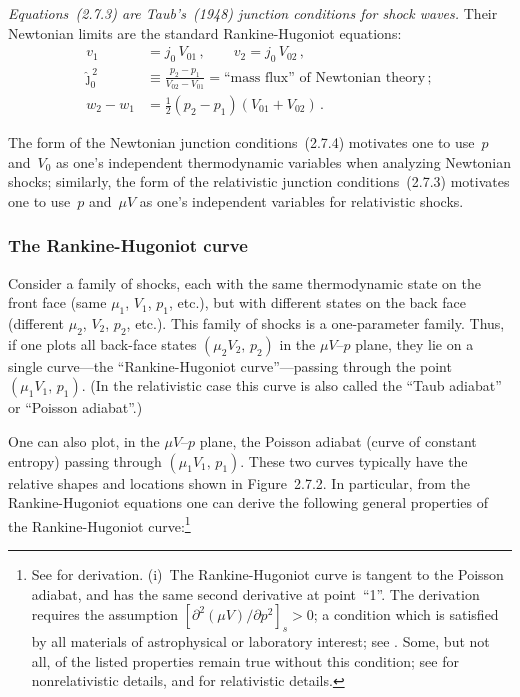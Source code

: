\emph{Equations~\textnormal{(2.7.3)} are Taub's~\textnormal{(1948)} junction
conditions for shock waves.}
Their Newtonian limits are the standard Rankine-Hugoniot equations:
%
\begin{align}
  v_1 &= j_0\,V_{01}\,, \qquad v_2 = j_0\,V_{02}\,,
  \tag{2.7.4a} \\[4pt]
  \hat{\jmath}_0^{\,2} &\equiv \frac{p_2 - p_1}{V_{02} - V_{01}}
  = \text{``mass flux'' of Newtonian theory}\,;
  \tag{2.7.4b} \\[4pt]
  w_2 - w_1 &= \tfrac{1}{2}(p_2 - p_1)(V_{01} + V_{02})\,.
  \tag{2.7.4c}
\end{align}

The form of the Newtonian junction conditions~(2.7.4) motivates one to use~$p$
and~$V_0$ as one's independent thermodynamic variables when analyzing
Newtonian shocks; similarly, the form of the relativistic junction
conditions~(2.7.3) motivates one to use~$p$ and~$\mu V$ as one's independent
variables for relativistic shocks.


\subsubsection*{The Rankine-Hugoniot curve}

Consider a family of shocks, each with the same thermodynamic state on the
front face (same $\mu_1$, $V_1$, $p_1$, etc.), but with different states on the
back face (different $\mu_2$, $V_2$, $p_2$, etc.).  This family of shocks is
a one-parameter family.  Thus, if one plots all back-face states
$(\mu_2 V_2,\,p_2)$ in the $\mu V$--$p$ plane, they lie on a single
curve---the ``Rankine-Hugoniot curve''---passing through the point
$(\mu_1 V_1,\,p_1)$.  (In the relativistic case this curve is also called the
``Taub adiabat'' or ``Poisson adiabat''.)

One can also plot, in the $\mu V$--$p$ plane, the Poisson adiabat (curve of
constant entropy) passing through $(\mu_1 V_1,\,p_1)$.  These two curves
typically have the relative shapes and locations shown in Figure~2.7.2.  In
particular, from the Rankine-Hugoniot equations one can derive the following
general properties of the Rankine-Hugoniot
curve:\footnote{See \citet{Thorne1973a} for derivation.  (i)~The
  Rankine-Hugoniot curve is tangent to the Poisson adiabat, and has the same
  second derivative at point~``1''.  The derivation requires the assumption
  $[\partial^2(\mu V)/\partial p^2]_{s} > 0$; a condition which is satisfied
  by all materials of astrophysical or laboratory interest; see
  \citet{LandauLifshitz1959}.  Some, but not all, of the listed properties
  remain true without this condition; see \citet{ZeldovichRaizer1966} for
  nonrelativistic details, and \citet{Thorne1973a} for relativistic details.}

